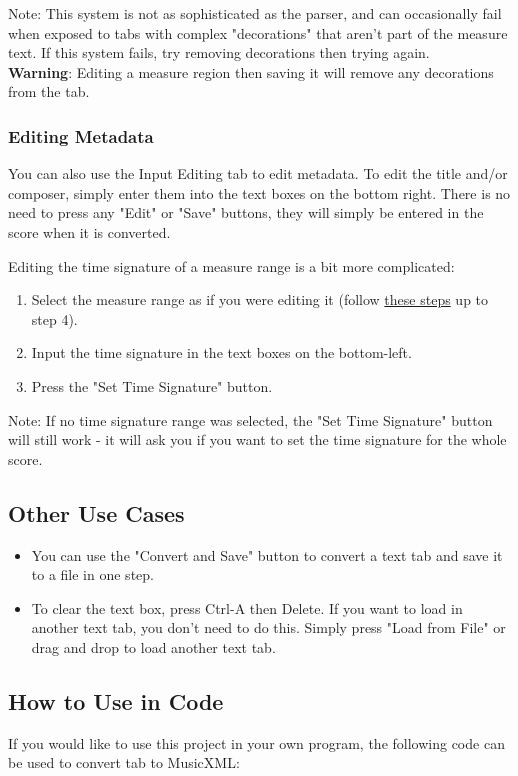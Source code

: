 \documentclass[11pt]{article}
\begin{document}
Note: This system is not as sophisticated as the parser, and can occasionally fail when exposed to tabs with complex "decorations" that aren't part of the measure text.  If this system fails, try removing decorations then trying again. \\
\textbf{Warning}: Editing a measure region then saving it will remove any decorations from the tab.
\subsubsection{Editing Metadata}
\label{sec:org611f558}
You can also use the Input Editing tab to edit metadata.  To edit the title and/or composer, simply enter them into the text boxes on the bottom right.  There is no need to press any "Edit" or "Save" buttons, they will simply be entered in the score when it is converted.

Editing the time signature of a measure range is a bit more complicated:
\begin{enumerate}
\item Select the measure range as if you were editing it (follow \hyperref[sec:orgf4bb2cd]{these steps} up to step 4).
\item Input the time signature in the text boxes on the bottom-left.
\item Press the "Set Time Signature" button.
\end{enumerate}

Note: If no time signature range was selected, the "Set Time Signature" button will still work - it will ask you if you want to set the time signature for the whole score.
\subsection{Other Use Cases}
\label{sec:orgca0c752}
\begin{itemize}
\item You can use the "Convert and Save" button to convert a text tab and save it to a file in one step.
\item To clear the text box, press Ctrl-A then Delete.  If you want to load in another text tab, you don't need to do this.  Simply press "Load from File" or drag and drop to load another text tab.
\end{itemize}
\subsection{How to Use in Code}
\label{sec:org377ac07}
If you would like to use this project in your own program, the following code can be used to convert tab to MusicXML:
\end{document}
